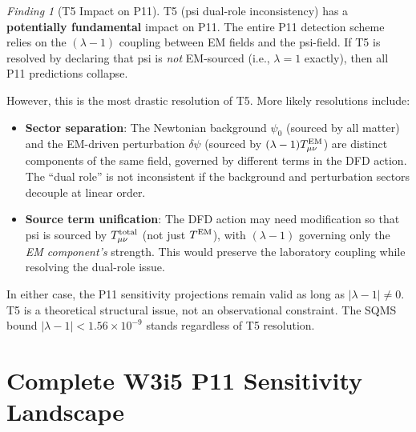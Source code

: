 \documentclass[11pt]{article}
\theoremstyle{definition}
\theoremstyle{remark}
\newtheorem{finding}[theorem]{Finding}
\newcommand{\lam}{\lambda}
\newcommand{\ee}[1]{\times 10^{#1}}
\begin{document}
\begin{finding}[T5 Impact on P11]
\label{find:t5_p11}
T5 (psi dual-role inconsistency) has a \textbf{potentially fundamental}
impact on P11. The entire P11 detection scheme relies on the
$(\lam-1)$ coupling between EM fields and the psi-field. If T5 is
resolved by declaring that psi is \emph{not} EM-sourced (i.e.,
$\lam = 1$ exactly), then all P11 predictions collapse.

However, this is the most drastic resolution of T5. More likely
resolutions include:
\begin{itemize}
\item \textbf{Sector separation}: The Newtonian background $\psi_0$
  (sourced by all matter) and the EM-driven perturbation $\delta\psi$
  (sourced by $(\lam-1)T^{\rm EM}_{\mu\nu}$) are distinct components
  of the same field, governed by different terms in the DFD action.
  The ``dual role'' is not inconsistent if the background and perturbation
  sectors decouple at linear order.

\item \textbf{Source term unification}: The DFD action may need
  modification so that psi is sourced by $T_{\mu\nu}^{\rm total}$ (not
  just $T^{\rm EM}$), with $(\lam-1)$ governing only the \emph{EM
  component's} strength. This would preserve the laboratory coupling
  while resolving the dual-role issue.
\end{itemize}

In either case, the P11 sensitivity projections remain valid as long
as $|\lam-1| \neq 0$. T5 is a theoretical structural issue, not an
observational constraint. The SQMS bound $|\lam-1| < 1.56\ee{-9}$
stands regardless of T5 resolution.
\end{finding}

\section{Complete W3i5 P11 Sensitivity Landscape}
\label{sec:p11_landscape}
\end{document}
